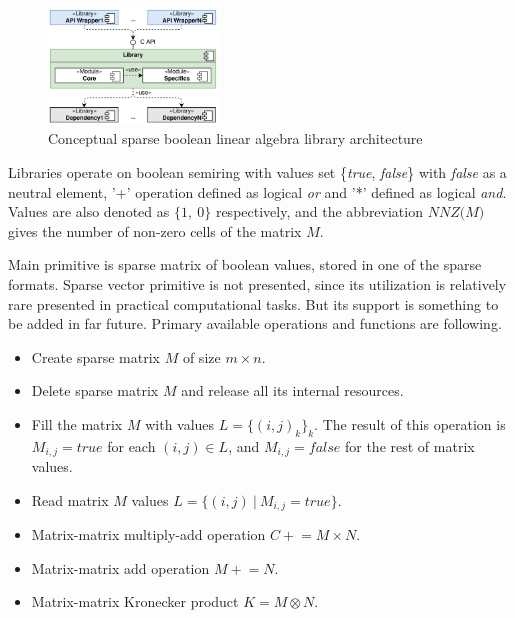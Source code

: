 \begin{figure}[t]
    \centering
    \includegraphics[width=0.4\textwidth]{generic_architecture.png}
    \caption{Conceptual sparse boolean linear algebra library architecture}
    \label{fig:generic_architecture}
\end{figure}

Libraries operate on boolean semiring with values set \{\textit{true}, \textit{false}\} with \textit{false} as 
a neutral element, '+' operation defined as logical \textit{or} and '*' defined as logical \textit{and}. Values are also denoted as $\{1,~0\}$ respectively, and the abbreviation $\textit{NNZ(M)}$ gives the number of non-zero cells of the matrix $M$.

Main primitive is sparse matrix of boolean values, stored in one of the sparse formats. Sparse vector 
primitive is not presented, since its utilization is relatively rare presented in practical computational 
tasks. But its support is something to be added in far future. Primary available operations and functions are following.

\begin{itemize}
    \item Create sparse matrix $M$ of size $m \times n$.
    \item Delete sparse matrix $M$ and release all its internal resources.
    \item Fill the matrix $M$ with values $L = \{(i,j)_k\}_k$. The result of this operation is $M_{i,j} = 
    \textit{true}$ for each $(i, j) \in L$, and $M_{i,j} = \textit{false}$ for the rest of matrix values.
    \item Read matrix $M$ values $L = \{(i, j)~|~M_{i,j} = \textit{true}\}$.
    \item Matrix-matrix multiply-add operation $C \mathrel{+}= M \times N$.
    \item Matrix-matrix add operation $M \mathrel{+}= N$.
    \item Matrix-matrix Kronecker product $K = M \otimes N$.
\end{itemize}